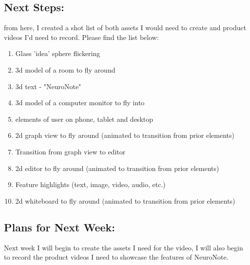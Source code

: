 \subsection*{Next Steps:}
from here, I created a shot list of both assets I would need to create and product videos I'd need to record. Please find the list below:
\begin{enumerate}
    \item Glass 'idea' sphere flickering
    \item 3d model of a room to fly around
    \item 3d text - "NeuroNote"
    \item 3d model of a computer monitor to fly into
    \item elements of user on phone, tablet and desktop
    \item 2d graph view to fly around (animated to transition from prior elements)
    \item Transition from graph view to editor
    \item 2d editor to fly around (animated to transition from prior elements)
    \item Feature highlights (text, image, video, audio, etc.)
    \item 2d whiteboard to fly around (animated to transition from prior elements)
\end{enumerate}

\subsection*{Plans for Next Week:}
Next week I will begin to create the assets I need for the video, I will also begin to record the product videos I need to showcase the features of NeuroNote.



